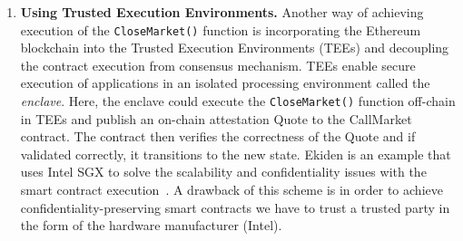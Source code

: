 \begin{enumerate}
\begin{itemize}
\end{itemize}


\item \textbf{{Using Trusted Execution Environments.}} Another way of achieving execution of the \texttt{CloseMarket()} function is incorporating the Ethereum blockchain into the Trusted Execution Environments (TEEs) and decoupling the contract execution from consensus mechanism. TEEs enable secure execution of applications in an isolated processing environment called the \textit{enclave}. Here, the enclave could execute the \texttt{CloseMarket()} function off-chain in TEEs and publish an on-chain attestation Quote to the CallMarket contract. The contract then verifies the correctness of the Quote and if validated correctly, it transitions to the new state. Ekiden is an example that uses Intel SGX to solve the scalability and confidentiality issues with the smart contract execution~\cite{cheng2019ekiden}. A drawback of this scheme is in order to achieve confidentiality-preserving smart contracts we have to trust a trusted party in the form of the hardware manufacturer (\eg Intel).


\end{enumerate}















